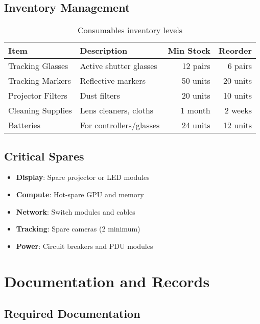 \subsection{Inventory Management}


\begin{table}[H]
\centering
\begin{tabularx}{\textwidth}{@{}lXrr@{}}
\toprule
\textbf{Item} & \textbf{Description} & \textbf{Min Stock} & \textbf{Reorder} \\
\midrule
Tracking Glasses & Active shutter glasses & 12 pairs & 6 pairs \\
Tracking Markers & Reflective markers & 50 units & 20 units \\
Projector Filters & Dust filters & 20 units & 10 units \\
Cleaning Supplies & Lens cleaners, cloths & 1 month & 2 weeks \\
Batteries & For controllers/glasses & 24 units & 12 units \\
\bottomrule
\end{tabularx}
\caption{Consumables inventory levels}
\end{table}

\subsection{Critical Spares}

\begin{itemize}
    \item \textbf{Display}: Spare projector or LED modules
    \item \textbf{Compute}: Hot-spare GPU and memory
    \item \textbf{Network}: Switch modules and cables
    \item \textbf{Tracking}: Spare cameras (2 minimum)
    \item \textbf{Power}: Circuit breakers and PDU modules
\end{itemize}

\section{Documentation and Records}

\subsection{Required Documentation}

